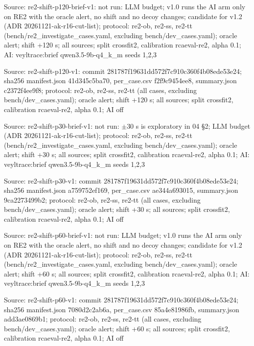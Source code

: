\noindent Source: re2-shift-p120-brief-v1: not run: LLM budget; v1.0 runs the AI arm only on RE2 with the oracle alert, no shift and no decoy changes; candidate for v1.2 (ADR 20261121-ak-r16-cut-list); protocol: re2-ob, re2-ss, re2-tt (bench/\allowbreak{}re2\_investigate\_cases.yaml, excluding bench/\allowbreak{}dev\_cases.yaml); oracle alert; shift +120 s; all sources; split crossfit2, calibration rcaeval-re2, alpha 0.1; AI: veyltrace:brief qwen3.5-9b-q4\_k\_m seeds 1,2,3\par
\noindent Source: re2-shift-p120-v1: commit 281787f19631dd572f7c910c360f4b08ede53e24; sha256 manifest.json 41d345c5ba70, per\_case.csv f2f9c9454ee8, summary.json c2372f4ee9f8; protocol: re2-ob, re2-ss, re2-tt (all cases, excluding bench/\allowbreak{}dev\_cases.yaml); oracle alert; shift +120 s; all sources; split crossfit2, calibration rcaeval-re2, alpha 0.1; AI off\par
\noindent Source: re2-shift-p30-brief-v1: not run: $\pm$30 s is exploratory in 04 \S{}2; LLM budget (ADR 20261121-ak-r16-cut-list); protocol: re2-ob, re2-ss, re2-tt (bench/\allowbreak{}re2\_investigate\_cases.yaml, excluding bench/\allowbreak{}dev\_cases.yaml); oracle alert; shift +30 s; all sources; split crossfit2, calibration rcaeval-re2, alpha 0.1; AI: veyltrace:brief qwen3.5-9b-q4\_k\_m seeds 1,2,3\par
\noindent Source: re2-shift-p30-v1: commit 281787f19631dd572f7c910c360f4b08ede53e24; sha256 manifest.json a759752ef169, per\_case.csv ae344a693015, summary.json 9ca2273499b2; protocol: re2-ob, re2-ss, re2-tt (all cases, excluding bench/\allowbreak{}dev\_cases.yaml); oracle alert; shift +30 s; all sources; split crossfit2, calibration rcaeval-re2, alpha 0.1; AI off\par
\noindent Source: re2-shift-p60-brief-v1: not run: LLM budget; v1.0 runs the AI arm only on RE2 with the oracle alert, no shift and no decoy changes; candidate for v1.2 (ADR 20261121-ak-r16-cut-list); protocol: re2-ob, re2-ss, re2-tt (bench/\allowbreak{}re2\_investigate\_cases.yaml, excluding bench/\allowbreak{}dev\_cases.yaml); oracle alert; shift +60 s; all sources; split crossfit2, calibration rcaeval-re2, alpha 0.1; AI: veyltrace:brief qwen3.5-9b-q4\_k\_m seeds 1,2,3\par
\noindent Source: re2-shift-p60-v1: commit 281787f19631dd572f7c910c360f4b08ede53e24; sha256 manifest.json 7080d2c2ab6a, per\_case.csv 85a4e81986fb, summary.json add3ae0869b1; protocol: re2-ob, re2-ss, re2-tt (all cases, excluding bench/\allowbreak{}dev\_cases.yaml); oracle alert; shift +60 s; all sources; split crossfit2, calibration rcaeval-re2, alpha 0.1; AI off\par

